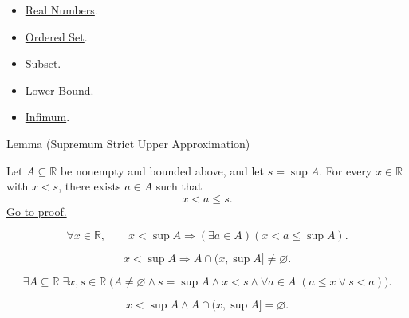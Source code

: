 \begin{dependencies}
\begin{itemize}
\item \hyperref[def:reals]{Real Numbers}.
\item \hyperref[def:ordered-set]{Ordered Set}.
\item \hyperref[def:subset]{Subset}.
\item \hyperref[def:real-lower-bound]{Lower Bound}.
\item \hyperref[def:infimum]{Infimum}.
\end{itemize}
\end{dependencies}

\begin{lemmabox}{Lemma (Supremum Strict Upper Approximation)}
\begin{lemma}
\label{lem:supremum-strict-upper-approximation}
Let $A\subseteq\mathbb{R}$ be nonempty and bounded above, and let
$s=\sup A$.  For every $x\in\mathbb{R}$ with $x<s$, there exists
$a\in A$ such that
\[
x<a\le s.
\]
\hyperref[prf:supremum-strict-upper-approximation]{Go to proof.}
\end{lemma}
\end{lemmabox}
\begin{remark*}
\[
\forall x\in\mathbb{R},\qquad
x<\sup A
\Rightarrow
(\exists a\in A)(x<a\leq\sup A).
\]
\end{remark*}
\begin{remark*}
\[
x<\sup A\Rightarrow A\cap(x,\sup A]\ne\varnothing.
\]
\end{remark*}
\begin{remark*}
\[
\exists A\subseteq\mathbb{R}\;\exists x,s\in\mathbb{R}\;
\bigl(A\ne\varnothing\land s=\sup A\land x<s\land
\forall a\in A\;(a\le x\lor s<a)\bigr).
\]
\end{remark*}
\begin{remark*}
\[
x<\sup A\land A\cap(x,\sup A]=\varnothing.
\]
\end{remark*}


